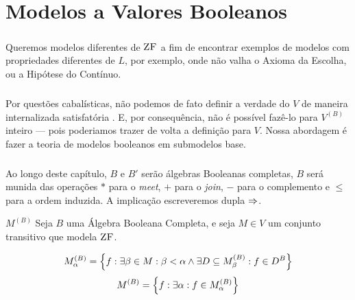 \chapter{Modelos a Valores Booleanos}
    \cls
    \paragraph{}
        Queremos modelos diferentes de $\text{\sc ZF}$
        a fim de encontrar exemplos de modelos 
        com propriedades diferentes de $L$, 
        por exemplo, onde não valha o Axioma 
        da Escolha, ou a Hipótese do Contínuo.
    \paragraph{}
        Por questões cabalísticas, não podemos 
        de fato definir a verdade do $V$ de 
        maneira internalizada satisfatória
        \cite{Tarski}. E, por consequência,
        não é possível fazê-lo para $V^{(B)}$
        inteiro --- pois poderiamos trazer de 
        volta a definição para $V$. Nossa 
        abordagem é fazer a teoria de modelos 
        booleanos em submodelos base.
    \paragraph{}
        Ao longo deste capítulo, $B$ e $B'$ 
        serão álgebras Booleanas completas, 
        $B$ será munida das operações 
        $*$ para o \textit{meet}, $+$ para 
        o \textit{join}, $-$ para o 
        complemento e $\leq$ para a ordem 
        induzida. A implicação escreveremos 
        dupla $\Rightarrow$.
    \begin{definition}{$ M^{(B)} $}
        Seja $B$ uma Álgebra Booleana Completa, 
        e seja $M\in V$ um conjunto transitivo 
        que modela $\text{\sc ZF}$.

        $$ \M{B}_{\alpha} = \SET{ f : \exists\beta\in M:\beta<\alpha\land\exists D\subseteq \M{B}_{\beta} : f\in D^B } $$
        $$ \M{B} = \SET{f : \exists\alpha: f\in \M{B}_{\alpha}} $$
    \end{definition}
